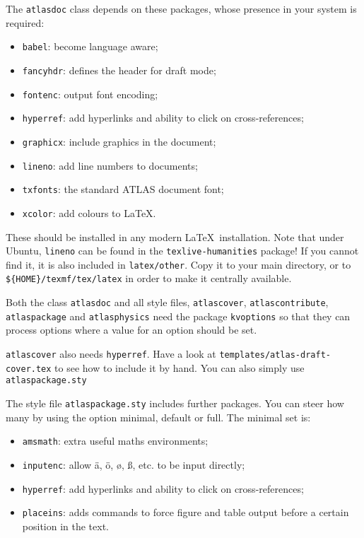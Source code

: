 \documentclass[atlasstyle,UKenglish]{latex/atlasdoc}
\newcommand{\File}[1]{\texttt{#1}\xspace}
\newcommand{\Option}[1]{\textsf{#1}\xspace}
\newcommand{\Package}[1]{\texttt{#1}\xspace}
\begin{document}
The \Package{atlasdoc} class depends on these packages, whose presence in
your system is required:
\begin{itemize}\setlength{\parskip}{0pt}\setlength{\itemsep}{0pt}
\item \Package{babel}: become language aware;
\item \Package{fancyhdr}: defines the header for draft mode;
\item \Package{fontenc}: output font encoding;
\item \Package{hyperref}: add hyperlinks and ability to click on cross-references;
\item \Package{graphicx}: include graphics in the document;
\item \Package{lineno}: add line numbers to documents;
\item \Package{txfonts}: the standard ATLAS document font;
\item \Package{xcolor}: add colours to \LaTeX.
\end{itemize}
These should be installed in any modern \LaTeX\ installation.
Note that under Ubuntu, \Package{lineno} can be found in the
\Package{texlive-humanities} package!
If you cannot find it, it is also included in \File{latex/other}.
Copy it to your main directory, or to \verb|${HOME}/texmf/tex/latex| in order to make
it centrally available.

Both the class \Package{atlasdoc} and all style files, 
\Package{atlascover}, \Package{atlascontribute}, \Package{atlaspackage} and \Package{atlasphysics}
need the package \Package{kvoptions} 
so that they can process options where a value for an option should be set.

\texttt{atlascover} also needs \texttt{hyperref}. 
Have a look at \texttt{templates/atlas-draft-cover.tex} to see how to include it by hand.
You can also simply use \texttt{atlaspackage.sty}

The style file \texttt{atlaspackage.sty} includes further packages.
You can steer how many by using the option \Option{minimal}, \Option{default} or \Option{full}.
The minimal set is:
\begin{itemize}\setlength{\parskip}{0pt}\setlength{\itemsep}{0pt}
\item \texttt{amsmath}: extra useful maths environments;
\item \texttt{inputenc}: allow ä, ö, ø, ß, etc. to be input directly;
\item \texttt{hyperref}: add hyperlinks and ability to click on cross-references;
\item \texttt{placeins}: adds commands to force figure and table output before a certain position in the text.
\end{itemize}
\end{document}
